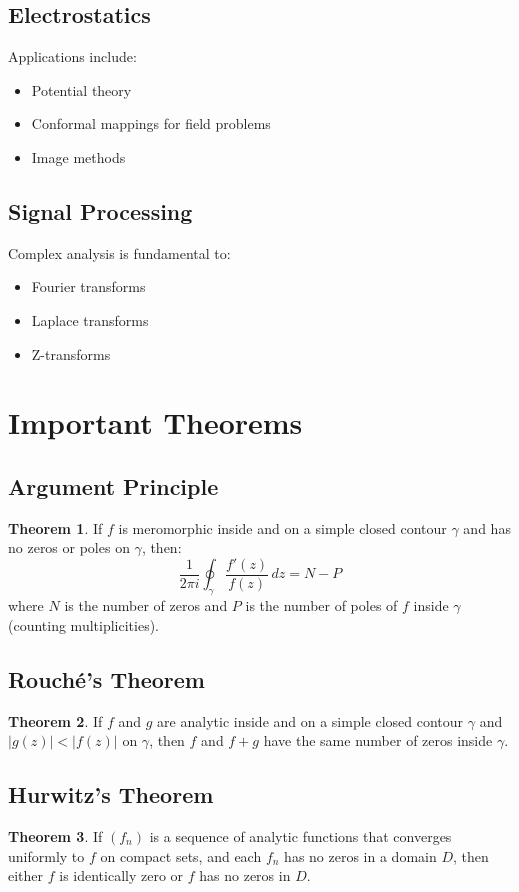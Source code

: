 \documentclass[11pt]{article}
\theoremstyle{definition}
\newtheorem{theorem}{Theorem}[section]
\begin{document}
\subsection{Electrostatics}
Applications include:
\begin{itemize}
    \item Potential theory
    \item Conformal mappings for field problems
    \item Image methods
\end{itemize}

\subsection{Signal Processing}
Complex analysis is fundamental to:
\begin{itemize}
    \item Fourier transforms
    \item Laplace transforms
    \item Z-transforms
\end{itemize}

\section{Important Theorems}

\subsection{Argument Principle}
\begin{theorem}
If $f$ is meromorphic inside and on a simple closed contour $\gamma$ and has no zeros or poles on $\gamma$, then:
$$\frac{1}{2\pi i} \oint_\gamma \frac{f'(z)}{f(z)} \, dz = N - P$$
where $N$ is the number of zeros and $P$ is the number of poles of $f$ inside $\gamma$ (counting multiplicities).
\end{theorem}

\subsection{Rouché's Theorem}
\begin{theorem}
If $f$ and $g$ are analytic inside and on a simple closed contour $\gamma$ and $|g(z)| < |f(z)|$ on $\gamma$, then $f$ and $f + g$ have the same number of zeros inside $\gamma$.
\end{theorem}

\subsection{Hurwitz's Theorem}
\begin{theorem}
If $(f_n)$ is a sequence of analytic functions that converges uniformly to $f$ on compact sets, and each $f_n$ has no zeros in a domain $D$, then either $f$ is identically zero or $f$ has no zeros in $D$.
\end{theorem}
\end{document}
